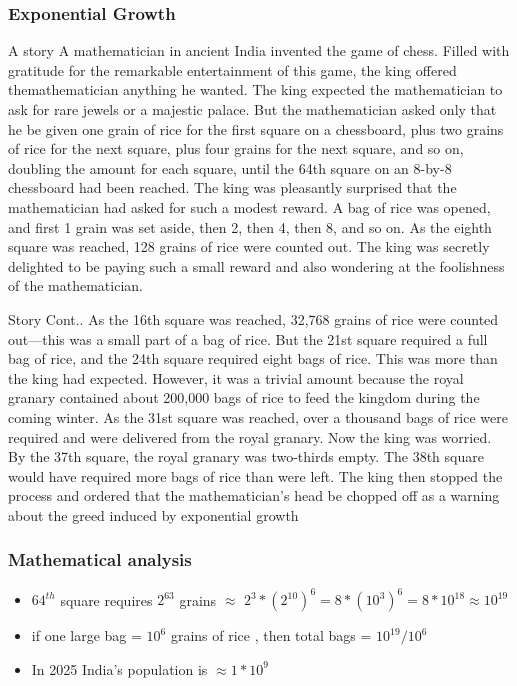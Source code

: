   \begin{frame}
  \frametitle{Exponential Growth}
  \begin{block}{A story}
A mathematician in ancient India invented the game of chess. Filled with gratitude for the remarkable entertainment of this game, the king offered themathematician anything he wanted. The king expected the mathematician to
ask for rare jewels or a majestic palace.
But the mathematician asked only that he be given one grain of rice for the
first square on a chessboard, plus two grains of rice for the next square, plus
four grains for the next square, and so on, doubling the amount for each square,
until the 64th square on an 8-by-8 chessboard had been reached. The king was
pleasantly surprised that the mathematician had asked for such a modest reward.
A bag of rice was opened, and first 1 grain was set aside, then 2, then 4, then 8,
and so on. As the eighth square  was
reached, 128 grains of rice were counted out. The king was secretly delighted
to be paying such a small reward and also wondering at the foolishness of the
mathematician.
  \end{block}
  
  \end{frame}

  \begin{frame}
    \begin{block}{Story Cont..}
      As the 16th square was reached, 32,768 grains of rice were counted out—this
was a small part of a bag of rice. But the 21st square required a full bag of rice,
and the 24th square required eight bags of rice. This was more than the king had
expected. However, it was a trivial amount because the royal granary contained
about 200,000 bags of rice to feed the kingdom during the coming winter.
As the 31st square was reached, over a thousand bags of rice were required
and were delivered from the royal granary. Now the king was worried. By the
37th square, the royal granary was two-thirds empty. The 38th square would have
required more bags of rice than were left. The king then stopped the process
and ordered that the mathematician's head be chopped off as a warning about
the greed induced by exponential growth
    \end{block}
  \end{frame}
  \begin{frame}
    \frametitle{Mathematical analysis}
    \begin{itemize}
      \item \(64^{th}\) square requires \( 2^{63} \) grains \(\approx\) \(2^{3}* (2^{10})^{6} = 8*(10^{3})^{6} = 8*10^{18} \approx 10^{19} \) 
      \item if one large bag = \(10^{6} \) grains of rice , then total bags = \(10^{19}/10^{6} \) 
      \item In 2025 India's population is \(\approx 1 * 10^{9} \)
    \end{itemize}
     
    \end{frame}

